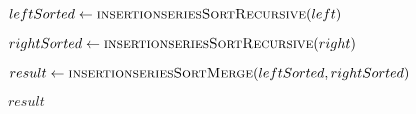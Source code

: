 \begin{frame}[containsverbatim]{\insertionseriesexampleframe}
\begin{columns}[c]
\begin{column}{0.4\textwidth}
{\begin{minipage}[c]{\textwidth}
\begin{algorithm}[H]
\begin{algorithmic}[1]
                                            \label{insertionseriesSortRecursive before leftSorted}
                                            \State $leftSorted \gets \Call{insertionseriesSortRecursive}{left}$
                                            \label{insertionseriesSortRecursive after leftsorted}
                                            
                                            \label{insertionseriesSortRecursive before rightSorted}
                                            \State $rightSorted \gets \Call{insertionseriesSortRecursive}{right}$
                                            \label{insertionseriesSortRecursive after rightsorted}
                                            
                                            \label{insertionseriesSortRecursive before insertionseriesSortMerge result}
                                            \State $result \gets \Call{insertionseriesSortMerge}{leftSorted, rightSorted}$
                                            \label{insertionseriesSortRecursive after insertionseriesSortMerge result}
                    
                                            \State \Return $result$
                                        \EndFunction
                                    \end{algorithmic}
                                \end{algorithm}
                            \endgroup
                        \end{minipage}
                    }
                \end{column}

                \begin{column}{0.6\textwidth}
                    \vspace{-0.05cm}
                    \tiny
                    \noindent {}
\end{column}
\end{columns}
\end{frame}
